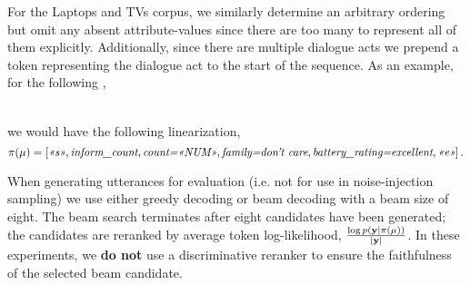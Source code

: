     For the Laptops and TVs corpus, we similarly determine an arbitrary ordering
    but omit any absent attribute-values since there are too many to represent
    all of them explicitly. Additionally, since there are multiple dialogue acts we prepend a token representing the dialogue act to the start of the sequence. As an example, for the following \meaningrepresentation, \\[-15pt]
\begin{singlespace}
    \centering
\end{singlespace}~\\
\noindent we would have the following linearization,
\[\pi(\mu) = \left[\textit{<<s>>}, \textit{inform\_count}, \textit{count=<<NUM>>}, \textit{family=don't care}, \textit{battery\_rating=excellent}, \textit{<<e>>}\right].  \]



When generating utterances for evaluation (i.e. not for use in noise-injection sampling) we use either greedy decoding or beam decoding with a 
beam size of eight.
The beam search terminates after eight candidates have been generated;
the candidates are reranked by average token log-likelihood, $\frac{\log p\left(\mathbf{y}|\pi(\mu)\right)}{{\left\vert \mathbf{y} \right\vert}}$. In these experiments, we \textbf{do not} use a discriminative reranker to ensure the faithfulness of the 
selected beam candidate. 


